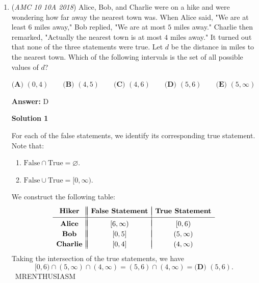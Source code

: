 \begin{enumerate}
 Education, the Study of Everything

 


	\item (\textit{AMC 10 10A 2018}) Alice, Bob, and Charlie were on a hike and were wondering how far away the nearest town was. When Alice said, "We are at least $6$ miles away," Bob replied, "We are at most $5$ miles away." Charlie then remarked, "Actually the nearest town is at most $4$ miles away." It turned out that none of the three statements were true. Let $d$ be the distance in miles to the nearest town. Which of the following intervals is the set of all possible values of $d$?


 $\textbf{(A) }   (0,4)   \qquad        \textbf{(B) }   (4,5)   \qquad    \textbf{(C) }   (4,6)   \qquad   \textbf{(D) }  (5,6)  \qquad  \textbf{(E) }   (5,\infty)$

 \textbf{Answer: }D



\textbf{Solution 1}

For each of the false statements, we identify its corresponding true statement. Note that:

 
            \begin{enumerate} 
        \item $\mathrm{False}\cap\mathrm{True}=\varnothing.$

        \item $\mathrm{False}\cup\mathrm{True}=[0,\infty).$

            \end{enumerate}
            We construct the following table:
 \[\begin{array}{c||c|c} & &  \\ [-2.5ex] \textbf{Hiker} & \textbf{False Statement} & \textbf{True Statement} \\ [0.5ex] \hline & & \\ [-2ex] \textbf{Alice} & [6,\infty) & [0,6) \\  & & \\ [-2.25ex] \textbf{Bob} & [0,5] & (5,\infty)  \\ & & \\ [-2.25ex] \textbf{Charlie} & [0,4] & (4,\infty) \end{array}\]Taking the intersection of the true statements, we have 
 \[[0,6)\cap(5,\infty)\cap(4,\infty)=(5,6)\cap(4,\infty)=\boxed{\textbf{(D) } (5,6)}.\]~MRENTHUSIASM

 




\end{enumerate}
